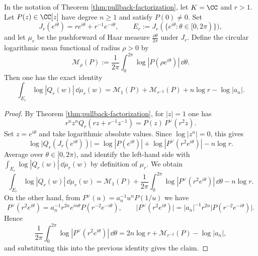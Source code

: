 \begin{theorem}\label{thm:elliptic-two-scale-stokes-mean}
In the notation of Theorem \ref{thm:pullback-factorization}, let \(K=\CC\) and \(r>1\). Let \(P(z)\in\CC[z]\) have degree \(n\ge 1\) and satisfy \(P(0)\neq 0\). Set
\[
J_r(e^{i\theta})=r e^{i\theta}+r^{-1}e^{-i\theta},
\qquad
E_r:=J_r(\{e^{i\theta}:\theta\in[0,2\pi)\}),
\]
and let \(\mu_r\) be the pushforward of Haar measure \(\frac{\dd\theta}{2\pi}\) under \(J_r\). Define the circular logarithmic mean functional of radius \(\rho>0\) by
\[
\mathcal M_\rho(P):=\frac1{2\pi}\int_{0}^{2\pi}\log|P(\rho e^{i\theta})|\,\dd\theta.
\]
Then one has the exact identity
\[
\boxed{\;
\int_{E_r}\log|Q_r(w)|\,\dd\mu_r(w)
=
\mathcal M_{1}(P)+\mathcal M_{r^{-2}}(P)+n\log r-\log|a_n|.
\;}
\]
\end{theorem}
\begin{proof}
By Theorem \ref{thm:pullback-factorization}, for \(|z|=1\) one has
\[
r^n z^n Q_r\!\left(r z+r^{-1}z^{-1}\right)=P(z)\,P^{\vee}(r^2 z).
\]
Set \(z=e^{i\theta}\) and take logarithmic absolute values. Since \(\log|z^n|=0\), this gives
\[
\log\bigl|Q_r(J_r(e^{i\theta}))\bigr|
=
\log|P(e^{i\theta})|+\log|P^\vee(r^2 e^{i\theta})|-n\log r.
\]
Average over \(\theta\in[0,2\pi)\), and identify the left-hand side with \(\int_{E_r}\log|Q_r(w)|\,\dd\mu_r(w)\) by definition of \(\mu_r\). We obtain
\[
\int_{E_r}\log|Q_r(w)|\,\dd\mu_r(w)
=\mathcal M_1(P)+\frac1{2\pi}\int_{0}^{2\pi}\log|P^\vee(r^2 e^{i\theta})|\,\dd\theta-n\log r.
\]
On the other hand, from \(P^\vee(u)=a_n^{-1}u^nP(1/u)\) we have
\[
P^\vee(r^2 e^{i\theta})=a_n^{-1}r^{2n}e^{in\theta}P(r^{-2}e^{-i\theta}),
\qquad
\bigl|P^\vee(r^2 e^{i\theta})\bigr|=|a_n|^{-1}r^{2n}\bigl|P(r^{-2}e^{-i\theta})\bigr|.
\]
Hence
\[
\frac1{2\pi}\int_{0}^{2\pi}\log|P^\vee(r^2 e^{i\theta})|\,\dd\theta
=2n\log r+\mathcal M_{r^{-2}}(P)-\log|a_n|,
\]
and substituting this into the previous identity gives the claim.
\end{proof}

